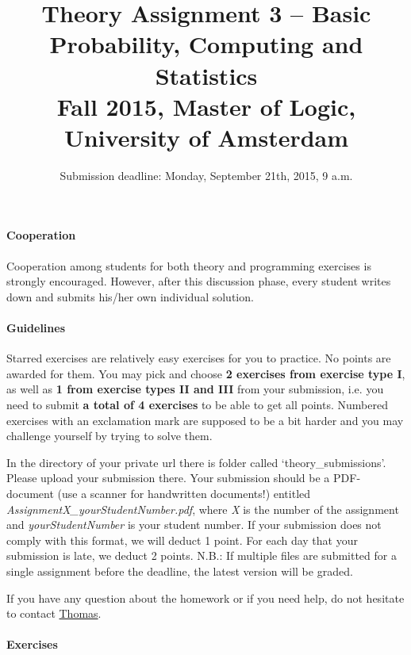 \documentclass{article}
\title{Theory Assignment 3 -- Basic Probability, Computing and Statistics\\[2mm]
\large{Fall 2015, Master of Logic, University of Amsterdam}}
\author{}
\date{Submission deadline: Monday, September 21th, 2015, 9 a.m.}
\begin{document}
\maketitle

\paragraph{Cooperation}
Cooperation among students for both theory and programming exercises
is strongly encouraged.  However, after this discussion phase, every student writes down and submits his/her own individual solution.

\paragraph{Guidelines}
Starred exercises are relatively easy exercises for you to practice. No points are awarded for them. You may pick and choose {\bf 2 exercises from exercise type I}, as well as {\bf 1 from exercise types II and III} from  your submission, i.e. you need to submit {\bf a total of 4 exercises} to be able to get all points. Numbered exercises with an exclamation mark are supposed to be a bit harder and you may challenge yourself by trying to solve them.

In the directory of your private url there is folder called `theory\_submissions'. Please upload your submission there. Your submission should be a PDF-document (use a scanner for handwritten documents!) entitled \textit{AssignmentX\_yourStudentNumber.pdf}, where \textit{X} is the number of the assignment and \textit{yourStudentNumber} is your student number. If your submission does not comply with this format, we will deduct 1 point. For each day that your submission is late, we deduct 2 points. N.B.: If multiple files are submitted for a single assignment before the deadline, the latest version will be graded.

If you have any question about the homework or if you need help, do not hesitate to contact \href{mailto:T.S.Brochhagen@uva.nl}{Thomas}.

\paragraph{Exercises}
\end{document}
